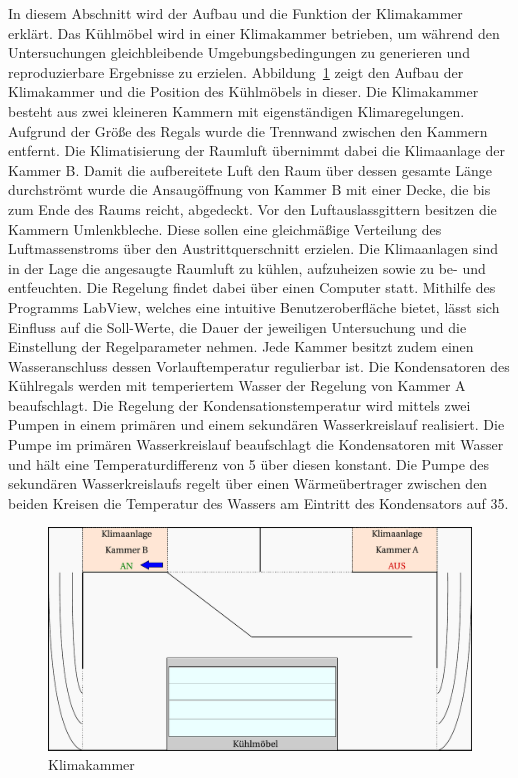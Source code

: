 In diesem Abschnitt wird der Aufbau und die Funktion der Klimakammer erklärt.
Das Kühlmöbel wird in einer Klimakammer betrieben, um während den Untersuchungen gleichbleibende Umgebungsbedingungen zu generieren und reproduzierbare Ergebnisse zu erzielen.
Abbildung~\ref{fig:Klimakammer} zeigt den Aufbau der Klimakammer und die Position des Kühlmöbels in dieser.
Die Klimakammer besteht aus zwei kleineren Kammern mit eigenständigen Klimaregelungen. Aufgrund der Größe des Regals wurde die Trennwand zwischen den Kammern entfernt. Die Klimatisierung der Raumluft übernimmt dabei die Klimaanlage der Kammer B. Damit die aufbereitete Luft den Raum über dessen gesamte Länge durchströmt wurde die Ansaugöffnung von Kammer B mit einer Decke, die bis zum Ende des Raums reicht, abgedeckt. Vor den Luftauslassgittern besitzen die Kammern Umlenkbleche. Diese sollen eine gleichmäßige Verteilung des Luftmassenstroms über den Austrittquerschnitt erzielen. Die Klimaanlagen sind in der Lage die angesaugte Raumluft zu kühlen, aufzuheizen sowie zu be- und entfeuchten. Die Regelung findet dabei über einen Computer statt. Mithilfe des Programms LabView, welches eine intuitive Benutzeroberfläche bietet, lässt sich Einfluss auf die Soll-Werte, die Dauer der jeweiligen Untersuchung und die Einstellung der Regelparameter nehmen. 
Jede Kammer besitzt zudem einen Wasseranschluss dessen Vorlauftemperatur regulierbar ist.
Die Kondensatoren des Kühlregals werden mit temperiertem Wasser der Regelung von Kammer A beaufschlagt. Die Regelung der Kondensationstemperatur wird mittels zwei Pumpen in einem primären und einem sekundären Wasserkreislauf realisiert. Die Pumpe im primären Wasserkreislauf beaufschlagt die Kondensatoren mit Wasser und hält eine Temperaturdifferenz von \unit{5}{\kelvin} über diesen konstant. Die Pumpe des sekundären Wasserkreislaufs regelt über einen Wärmeübertrager zwischen den beiden Kreisen die Temperatur des Wassers am Eintritt des Kondensators auf \unit{35}{\celsius}.


\begin{figure}[htb]
\centering
\includegraphics[scale=.6]{Pictures/ClimateChamber.pdf}
\caption{Klimakammer}
\label{fig:Klimakammer}
\end{figure}

